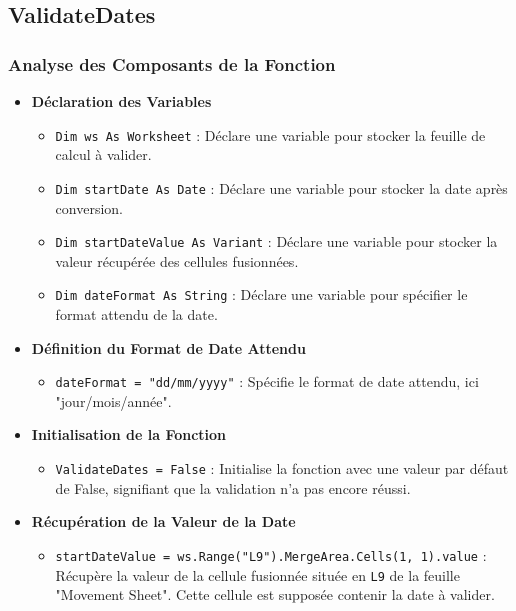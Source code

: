 \documentclass[a4paper, oneside, 12pt, final]{extreport}
\begin{document}
\subsection{ValidateDates}

\subsubsection{Analyse des Composants de la Fonction}

\begin{itemize}
    \item \textbf{Déclaration des Variables}
    \begin{itemize}
        \item \texttt{Dim ws As Worksheet} : Déclare une variable pour stocker la feuille de calcul à valider.
        \item \texttt{Dim startDate As Date} : Déclare une variable pour stocker la date après conversion.
        \item \texttt{Dim startDateValue As Variant} : Déclare une variable pour stocker la valeur récupérée des cellules fusionnées.
        \item \texttt{Dim dateFormat As String} : Déclare une variable pour spécifier le format attendu de la date.
    \end{itemize}

    \item \textbf{Définition du Format de Date Attendu}
    \begin{itemize}
        \item \texttt{dateFormat = "dd/mm/yyyy"} : Spécifie le format de date attendu, ici "jour/mois/année".
    \end{itemize}

    \item \textbf{Initialisation de la Fonction}
    \begin{itemize}
        \item \texttt{ValidateDates = False} : Initialise la fonction avec une valeur par défaut de False, signifiant que la validation n'a pas encore réussi.
    \end{itemize}

    \item \textbf{Récupération de la Valeur de la Date}
    \begin{itemize}
        \item \texttt{startDateValue = ws.Range("L9").MergeArea.Cells(1, 1).value} : Récupère la valeur de la cellule fusionnée située en \texttt{L9} de la feuille "Movement Sheet". Cette cellule est supposée contenir la date à valider.
    \end{itemize}


\end{itemize}
\end{document}
